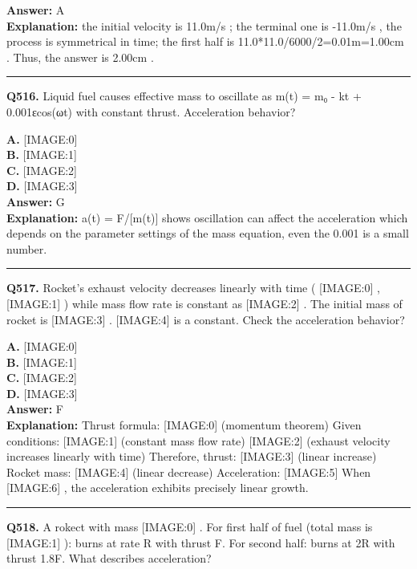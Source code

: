\documentclass[12pt]{article}
\begin{document}
\textbf{Answer:} A \\
\textbf{Explanation:} the initial velocity is 11.0m/s
; the terminal one is -11.0m/s
, the process is symmetrical in time; the first half is 11.0*11.0/6000/2=0.01m=1.00cm
. Thus, the answer is 2.00cm
.

\hrule
\vspace{1em}


\noindent
\textbf{Q516.} Liquid fuel causes effective mass to oscillate as m(t) = m₀ - kt + 0.001εcos(ωt) with constant thrust.
Acceleration behavior?



\textbf{A.} [IMAGE:0] \\
\textbf{B.} [IMAGE:1] \\
\textbf{C.} [IMAGE:2] \\
\textbf{D.} [IMAGE:3] \\

\textbf{Answer:} G \\
\textbf{Explanation:} a(t) = F/[m(t)] shows oscillation can affect the acceleration which depends on the parameter settings of the mass equation, even the 0.001 is a small number.

\hrule
\vspace{1em}


\noindent
\textbf{Q517.} Rocket's exhaust velocity decreases linearly with time (
[IMAGE:0]
,
[IMAGE:1]
) while mass flow rate is constant as
[IMAGE:2]
. The initial mass of rocket is
[IMAGE:3]
.
[IMAGE:4]
is a constant.
Check the acceleration behavior?



\textbf{A.} [IMAGE:0] \\
\textbf{B.} [IMAGE:1] \\
\textbf{C.} [IMAGE:2] \\
\textbf{D.} [IMAGE:3] \\

\textbf{Answer:} F \\
\textbf{Explanation:} Thrust formula:
[IMAGE:0]
(momentum theorem)
Given conditions:
[IMAGE:1]
(constant mass flow rate)
[IMAGE:2]
(exhaust velocity increases linearly with time)
Therefore, thrust:
[IMAGE:3]
(linear increase)
Rocket mass:
[IMAGE:4]
(linear decrease)
Acceleration:
[IMAGE:5]
When
[IMAGE:6]
, the acceleration exhibits precisely linear growth.

\hrule
\vspace{1em}


\noindent
\textbf{Q518.} A rokect with mass
[IMAGE:0]
. For first half of fuel (total mass is
[IMAGE:1]
): burns at rate R with thrust F. For second half: burns at 2R with thrust 1.8F.
What describes acceleration?
\end{document}
